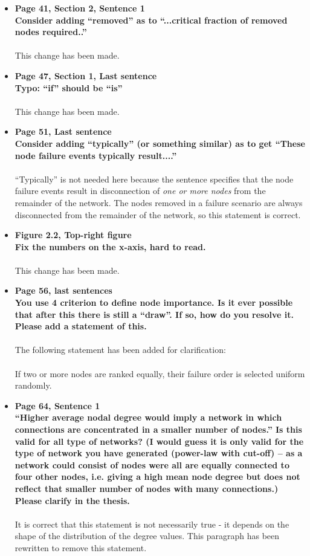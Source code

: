 \documentclass[a4paper,10pt]{article}
\begin{document}
\begin{itemize}
 \item \textbf{Page 41, Section 2, Sentence 1 \\
 Consider adding ``removed'' as to ``...critical fraction of removed nodes required..''}\\
 \\
 This change has been made.
 
 \item \textbf{Page 47, Section 1, Last sentence \\
 Typo: ``if'' should be ``is''}\\
 \\
 This change has been made.
 
 \item \textbf{Page 51, Last sentence \\
 Consider adding ``typically'' (or something similar) as to get ``These node failure events typically result....''}\\
 \\
 ``Typically'' is not needed here because the sentence specifies that the node failure events result in disconnection of \emph{one or more nodes} from the remainder of the network.  The nodes removed in a failure scenario are always disconnected from the remainder of the network, so this statement is correct.
 
 \item \textbf{Figure 2.2, Top-right figure \\
 Fix the numbers on the x-axis, hard to read.}\\
 \\
 This change has been made.
 
 \item \textbf{Page 56, last sentences \\
 You use 4 criterion to define node importance. Is it ever possible that after this there is still a ``draw''. If so, how do you resolve it. Please add a statement of this.}\\
 \\
 The following statement has been added for clarification:\\
 \\
 If two or more nodes are ranked equally, their failure order is selected uniform randomly. 
 
 \item \textbf{Page 64, Sentence 1 \\
 ``Higher average nodal degree would imply a network in which connections are concentrated in a smaller number of nodes.'' Is this valid for all type of networks? (I would guess it is only valid for the type of network you have generated (power-law with cut-off) – as a network could consist of nodes were all are equally connected to four other nodes, i.e. giving a high mean node degree but does not reflect that smaller number of nodes with many connections.) Please clarify in the thesis.}\\
 \\
 It is correct that this statement is not necessarily true - it depends on the shape of the distribution of the degree values.  This paragraph has been rewritten to remove this statement.
 

\end{itemize}
\end{document}
